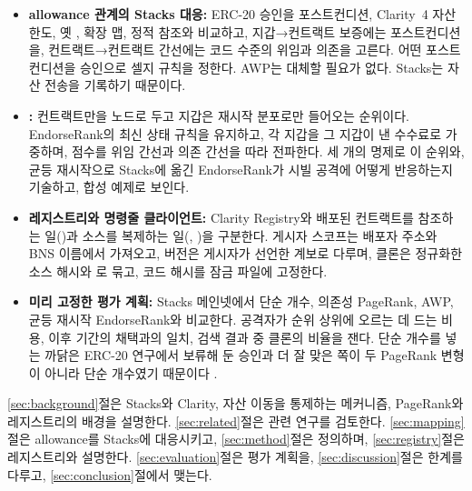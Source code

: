 \begin{itemize}
\item \textbf{allowance 관계의 Stacks 대응:} ERC-20 승인을 포스트컨디션, Clarity~4 자산 한도, 옛 , 확장 맵, 정적 참조와 비교하고, 지갑→컨트랙트 보증에는 포스트컨디션을, 컨트랙트→컨트랙트 간선에는 코드 수준의 위임과 의존을 고른다. 어떤 포스트컨디션을 승인으로 셀지 규칙을 정한다. AWP는 대체할 필요가 없다. Stacks는 자산 전송을 기록하기 때문이다.
\item \textbf{\PCER:} 컨트랙트만을 노드로 두고 지갑은 재시작 분포로만 들어오는 순위이다. EndorseRank의 최신 상태 규칙을 유지하고, 각 지갑을 그 지갑이 낸 수수료로 가중하며, 점수를 위임 간선과 의존 간선을 따라 전파한다. 세 개의 명제로 이 순위와, 균등 재시작으로 Stacks에 옮긴 EndorseRank가 시빌 공격에 어떻게 반응하는지 기술하고, 합성 예제로 보인다.
\item \textbf{레지스트리와 명령줄 클라이언트:} Clarity Registry와  배포된 컨트랙트를 참조하는 일()과 소스를 복제하는 일(, )을 구분한다. 게시자 스코프는 배포자 주소와 BNS 이름에서 가져오고, 버전은 게시자가 선언한 계보로 다루며, 클론은 정규화한 소스 해시와 로 묶고, 코드 해시를 잠금 파일에 고정한다.
\item \textbf{미리 고정한 평가 계획:} Stacks 메인넷에서  단순 개수, 의존성 PageRank, AWP, 균등 재시작 EndorseRank와 비교한다. 공격자가 순위 상위에 오르는 데 드는 비용, 이후 기간의 채택과의 일치, 검색 결과 중 클론의 비율을 잰다. 단순 개수를 넣는 까닭은 ERC-20 연구에서 보류해 둔 승인과 더 잘 맞은 쪽이 두 PageRank 변형이 아니라 단순 개수였기 때문이다 \cite{kwon2026endorserank}.
\end{itemize}

\ref{sec:background}절은 Stacks와 Clarity, 자산 이동을 통제하는 메커니즘, PageRank와 레지스트리의 배경을 설명한다. \ref{sec:related}절은 관련 연구를 검토한다. \ref{sec:mapping}절은 allowance를 Stacks에 대응시키고, \ref{sec:method}절은  정의하며, \ref{sec:registry}절은 레지스트리와  설명한다. \ref{sec:evaluation}절은 평가 계획을, \ref{sec:discussion}절은 한계를 다루고, \ref{sec:conclusion}절에서 맺는다.
